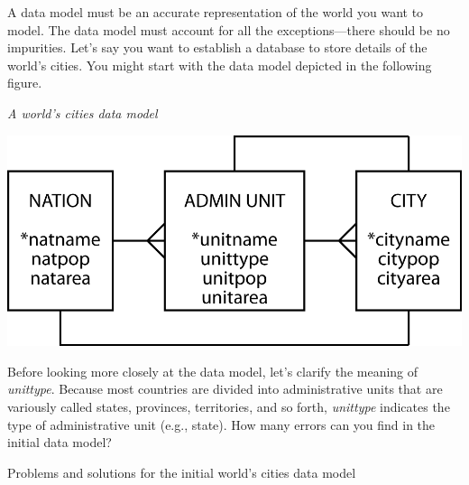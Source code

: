 \documentclass[
]{article}
\begin{document}
A data model must be an accurate representation of the world you want to
model. The data model must account for all the exceptions---there should
be no impurities. Let's say you want to establish a database to store
details of the world's cities. You might start with the data model
depicted in the following figure.

\emph{A world's cities data model}

\includegraphics[width=5.625in,height=\textheight]{Figures/Chapter 7/geography.png}

Before looking more closely at the data model, let's clarify the meaning
of \emph{unittype}. Because most countries are divided into administrative
units that are variously called states, provinces, territories, and so
forth, \emph{unittype} indicates the type of administrative unit (e.g.,
state). How many errors can you find in the initial data model?

Problems and solutions for the initial world's cities data model
\end{document}

